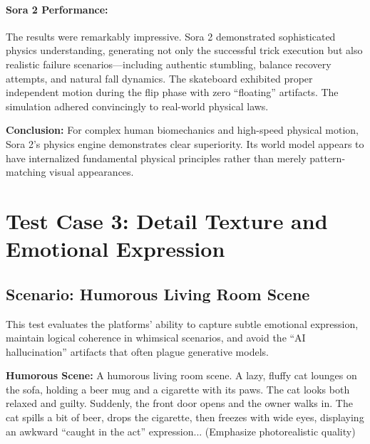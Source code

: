 \paragraph{Sora 2 Performance:}
The results were remarkably impressive. Sora 2 demonstrated sophisticated physics understanding, generating not only the successful trick execution but also realistic failure scenarios---including authentic stumbling, balance recovery attempts, and natural fall dynamics. The skateboard exhibited proper independent motion during the flip phase with zero ``floating'' artifacts. The simulation adhered convincingly to real-world physical laws.

\begin{resultbox}
\textbf{Conclusion:} For complex human biomechanics and high-speed physical motion, Sora 2's physics engine demonstrates clear superiority. Its world model appears to have internalized fundamental physical principles rather than merely pattern-matching visual appearances.
\end{resultbox}

\section{Test Case 3: Detail Texture and Emotional Expression}
\label{sec:test-case-3}

\subsection{Scenario: Humorous Living Room Scene}

This test evaluates the platforms' ability to capture subtle emotional expression, maintain logical coherence in whimsical scenarios, and avoid the ``AI hallucination'' artifacts that often plague generative models.

\begin{promptbox}
\small
\textbf{Humorous Scene:} A humorous living room scene. A lazy, fluffy cat lounges on the sofa, holding a beer mug and a cigarette with its paws. The cat looks both relaxed and guilty. Suddenly, the front door opens and the owner walks in. The cat spills a bit of beer, drops the cigarette, then freezes with wide eyes, displaying an awkward ``caught in the act'' expression... (Emphasize photorealistic quality)
\end{promptbox}

